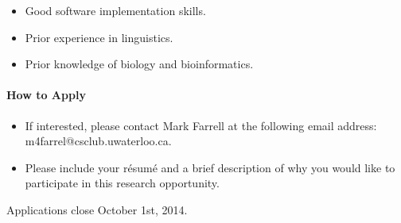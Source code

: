 \documentclass[10pt, a4paper, notitlepage]{article}
\begin{document}
\begin{itemize}
\item Good software implementation skills.
\item Prior experience in linguistics.
\item Prior knowledge of biology and bioinformatics.
\end{itemize}

\paragraph{How to Apply}

\begin{itemize}

\item If interested, please contact Mark Farrell at the following email address: m4farrel@csclub.uwaterloo.ca.
\item Please include your résumé and a brief description of why you would like to participate
in this research opportunity.
\end{itemize}

Applications close October 1st, 2014.
\end{document}
